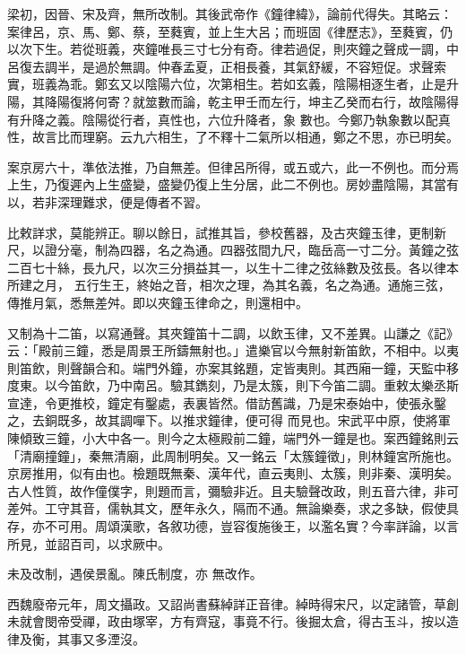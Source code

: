 \begin{pinyinscope}
 梁初，因晉、宋及齊，無所改制。其後武帝作《鐘律緯》，論前代得失。其略云：案律呂，京、馬、鄭、蔡，至蕤賓，並上生大呂；而班固《律歷志》，至蕤賓，仍以次下生。若從班義，夾鐘唯長三寸七分有奇。律若過促，則夾鐘之聲成一調，中呂復去調半，是過於無調。仲春孟夏，正相長養，其氣舒緩，不容短促。求聲索實，班義為乖。鄭玄又以陰陽六位，次第相生。若如玄義，陰陽相逐生者，止是升陽，其降陽復將何寄？就筮數而論，乾主甲壬而左行，坤主乙癸而右行，故陰陽得有升降之義。陰陽從行者，真性也，六位升降者，象
 數也。今鄭乃執象數以配真性，故言比而理窮。云九六相生，了不釋十二氣所以相通，鄭之不思，亦已明矣。



 案京房六十，準依法推，乃自無差。但律呂所得，或五或六，此一不例也。而分焉上生，乃復遲內上生盛變，盛變仍復上生分居，此二不例也。房妙盡陰陽，其當有以，若非深理難求，便是傳者不習。



 比敕詳求，莫能辨正。聊以餘日，試推其旨，參校舊器，及古夾鐘玉律，更制新尺，以證分毫，制為四器，名之為通。四器弦間九尺，臨岳高一寸二分。黃鐘之弦二百七十絲，長九尺，以次三分損益其一，以生十二律之弦絲數及弦長。各以律本所建之月，
 五行生王，終始之音，相次之理，為其名義，名之為通。通施三弦，傳推月氣，悉無差舛。即以夾鐘玉律命之，則還相中。



 又制為十二笛，以寫通聲。其夾鐘笛十二調，以飲玉律，又不差異。山謙之《記》云：「殿前三鐘，悉是周景王所鑄無射也。」遣樂官以今無射新笛飲，不相中。以夷則笛飲，則聲韻合和。端門外鐘，亦案其銘題，定皆夷則。其西廂一鐘，天監中移度東。以今笛飲，乃中南呂。驗其鐫刻，乃是太簇，則下今笛二調。重敕太樂丞斯宣達，令更推校，鐘定有鑿處，表裏皆然。借訪舊識，乃是宋泰始中，使張永鑿之，去銅既多，故其調嘽下。以推求鐘律，便可得
 而見也。宋武平中原，使將軍陳傾致三鐘，小大中各一。則今之太極殿前二鐘，端門外一鐘是也。案西鐘銘則云「清廟撞鐘」，秦無清廟，此周制明矣。又一銘云「太簇鐘徵」，則林鐘宮所施也。京房推用，似有由也。檢題既無秦、漢年代，直云夷則、太簇，則非秦、漢明矣。古人性質，故作僮僕字，則題而言，彌驗非近。且夫驗聲改政，則五音六律，非可差舛。工守其音，儒執其文，歷年永久，隔而不通。無論樂奏，求之多缺，假使具存，亦不可用。周頌漢歌，各敘功德，豈容復施後王，以濫名實？今率詳論，以言所見，並詔百司，以求厥中。



 未及改制，遇侯景亂。陳氏制度，亦
 無改作。



 西魏廢帝元年，周文攝政。又詔尚書蘇綽詳正音律。綽時得宋尺，以定諸管，草創未就會閔帝受禪，政由塚宰，方有齊寇，事竟不行。後掘太倉，得古玉斗，按以造律及衡，其事又多湮沒。




\end{pinyinscope}
